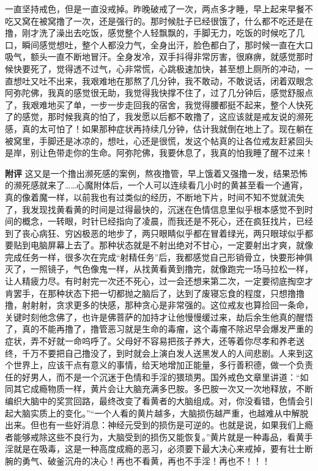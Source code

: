 \begin{case}
    一直坚持戒色，但是一直没戒掉。昨晚破戒了一次，两点多才睡，早上起来早餐不吃又窝在被窝撸了一次，还是强行的。那时候肚子已经很饿了，什么都不吃还是在撸，刚才洗了澡出去吃饭，感觉整个人轻飘飘的，手脚无力，吃饭的时候吃了几口，瞬间感觉想吐，整个人都没力气，全身出汗，脸色都白了，那时候一直在大口吸气，额头一直不断地冒汗。全身发冷，双手抖得非常厉害，很麻痹，就感觉那时候快要死了，觉得透不过气，心非常慌，心跳极速加快，甚至想上厕所的冲动，一直想吐又吐不出来，我艰难地在那熬了几分钟，我不敢动，不敢说话，闭着双眼念阿弥陀佛，我真的感觉很无助，我觉得我快撑不住了，过了几分钟后，感觉舒服点了，我艰难地买了单，一步一步走回我的宿舍，我觉得腰都挺不起来，整个人快死了的感觉，那时候我真的怕了，我发愿以后都不敢撸了，这应该就是戒友说的濒死感，真的太可怕了！如果那种症状再持续几分钟，估计我就倒在地上了。现在躺在被窝里，手脚还是冰凉的，想吐，心还是很慌，发这个帖真的让各位戒友赶紧回头是岸，别让色带走你的生命。阿弥陀佛，我要休息了，我真的怕我睡了醒不过来！

    \textbf{附评} 这又是一个撸出濒死感的案例，熬夜撸管，早上饿着又强撸一发，结果恐怖的濒死感就来了……心魔附体后，一个人可以连续看几小时的黄甚至看一个通宵，真的像着魔一样，以前我也有过类似的经历，不断地下片，时间不知不觉就流失了，我发现找黄看黄的时间是过得最快的，沉迷在色情信息里似乎根本感觉不到时间的概念，一转眼，时针已经指向了凌晨，而我还是不死心，还在疯狂找片，已经到了丧心病狂、穷凶极恶的地步了，两只眼睛似乎都在冒着绿光，两只眼球似乎都要贴到电脑屏幕上去了。那种状态就是不射出绝对不甘心，一定要射出才爽，就像完成任务一样，很多次在完成“射精任务”后，我都感觉自己形销骨立，快要形神俱灭了，一照镜子，气色像鬼一样，从找黄看黄到撸完，就像跑完一场马拉松一样，让人精疲力尽。有时射完一次还不死心，过一会还想来第二次，一定要彻底掏空才肯罢手，在那种状态下把一切都抛之脑后了，达到了废寝忘食的程度，只想撸撸撸，射射射，贪求更多的快感，那种贪心是非常强的。这位戒友也算捡回一条命，关键时刻他念佛了，也许是佛菩萨的加持才让他慢慢缓过来，劫后余生他真的醒悟了，真的不能再撸了，撸管恶习就是生命的毒瘤，这个毒瘤不除迟早会爆发严重的症状，弄不好就一命呜呼了。父母好不容易把孩子养大，还等着你尽孝和养老送终，千万不要把自己撸没了，到时就会上演白发人送黑发人的人间悲剧。人来到这个世界上，应该干点有意义的事情，给天地增加正能量，多行善积德，做一个负责任的好男人，而不是一个沉迷于色情和手淫的猥琐男。国外戒色文章里讲道：“如同其它成瘾物质一样，黄片会让大脑充满多巴胺。多巴胺一次又一次地释放，不断编织大脑中的奖赏回路，最终改变了看黄者的大脑组成。对，你没看错，色情会引起大脑实质上的变化。”“一个人看的黄片越多，大脑损伤越严重，也越难从中解脱出来。但也有一些好消息：神经元受到的损伤是可逆的。也就是说，如果我们上瘾者能够戒除这些不良行为，大脑受到的损伤又能恢复。”黄片就是一种毒品，看黄手淫就是在吸毒，这是一种高度成瘾的恶习，必须要下最大决心来戒掉，要有壮士断腕的勇气、破釜沉舟的决心！再也不看黄，再也不手淫！再也不！！！
\end{case}

